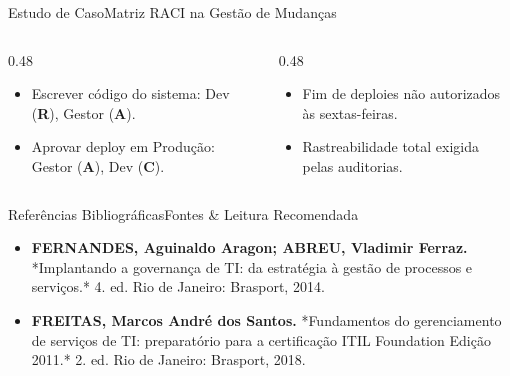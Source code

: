 \begin{senaiframe}{Estudo de Caso}{Matriz RACI na Gestão de Mudanças}
  \begin{columns}[t]
    \begin{column}{0.48\textwidth}
      \begin{tcolorbox}[senaibluecard, title={Atividade}]
        \begin{itemize}
          \item Escrever código do sistema: Dev (\textbf{R}), Gestor (\textbf{A}).
          \item Aprovar deploy em Produção: Gestor (\textbf{A}), Dev (\textbf{C}).
        \end{itemize}
      \end{tcolorbox}
    \end{column}
    \begin{column}{0.48\textwidth}
      \begin{tcolorbox}[senaigreencard, title={Resultado}]
        \begin{itemize}
          \item Fim de deploies não autorizados às sextas-feiras.
          \item Rastreabilidade total exigida pelas auditorias.
        \end{itemize}
      \end{tcolorbox}
    \end{column}
  \end{columns}
\end{senaiframe}

\begin{senaiframe}{Referências Bibliográficas}{Fontes \& Leitura Recomendada}
  \vspace{0.5cm}
  \begin{tcolorbox}[senaicard, title={Obras de Referência}]
    \begin{itemize}
      \item \textbf{FERNANDES, Aguinaldo Aragon; ABREU, Vladimir Ferraz.} *Implantando a governança de TI: da estratégia à gestão de processos e serviços.* 4. ed. Rio de Janeiro: Brasport, 2014.
      \item \textbf{FREITAS, Marcos André dos Santos.} *Fundamentos do gerenciamento de serviços de TI: preparatório para a certificação ITIL Foundation Edição 2011.* 2. ed. Rio de Janeiro: Brasport, 2018.
    \end{itemize}
  \end{tcolorbox}
\end{senaiframe}

